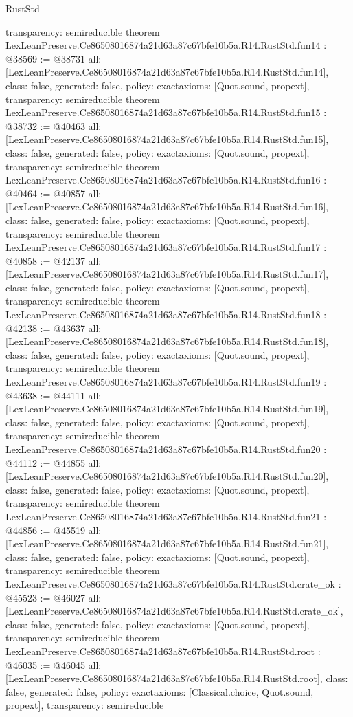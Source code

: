 \begin{lexlean}{RustStd}
\begin{coremodule}
{  transparency: semireducible
}
theorem LexLeanPreserve.Ce86508016874a21d63a87c67bfe10b5a.R14.RustStd.fun14 : @38569 := @38731 {
  all: [LexLeanPreserve.Ce86508016874a21d63a87c67bfe10b5a.R14.RustStd.fun14],
  class: false,
  generated: false,
  policy: exact{axioms: [Quot.sound, propext]},
  transparency: semireducible
}
theorem LexLeanPreserve.Ce86508016874a21d63a87c67bfe10b5a.R14.RustStd.fun15 : @38732 := @40463 {
  all: [LexLeanPreserve.Ce86508016874a21d63a87c67bfe10b5a.R14.RustStd.fun15],
  class: false,
  generated: false,
  policy: exact{axioms: [Quot.sound, propext]},
  transparency: semireducible
}
theorem LexLeanPreserve.Ce86508016874a21d63a87c67bfe10b5a.R14.RustStd.fun16 : @40464 := @40857 {
  all: [LexLeanPreserve.Ce86508016874a21d63a87c67bfe10b5a.R14.RustStd.fun16],
  class: false,
  generated: false,
  policy: exact{axioms: [Quot.sound, propext]},
  transparency: semireducible
}
theorem LexLeanPreserve.Ce86508016874a21d63a87c67bfe10b5a.R14.RustStd.fun17 : @40858 := @42137 {
  all: [LexLeanPreserve.Ce86508016874a21d63a87c67bfe10b5a.R14.RustStd.fun17],
  class: false,
  generated: false,
  policy: exact{axioms: [Quot.sound, propext]},
  transparency: semireducible
}
theorem LexLeanPreserve.Ce86508016874a21d63a87c67bfe10b5a.R14.RustStd.fun18 : @42138 := @43637 {
  all: [LexLeanPreserve.Ce86508016874a21d63a87c67bfe10b5a.R14.RustStd.fun18],
  class: false,
  generated: false,
  policy: exact{axioms: [Quot.sound, propext]},
  transparency: semireducible
}
theorem LexLeanPreserve.Ce86508016874a21d63a87c67bfe10b5a.R14.RustStd.fun19 : @43638 := @44111 {
  all: [LexLeanPreserve.Ce86508016874a21d63a87c67bfe10b5a.R14.RustStd.fun19],
  class: false,
  generated: false,
  policy: exact{axioms: [Quot.sound, propext]},
  transparency: semireducible
}
theorem LexLeanPreserve.Ce86508016874a21d63a87c67bfe10b5a.R14.RustStd.fun20 : @44112 := @44855 {
  all: [LexLeanPreserve.Ce86508016874a21d63a87c67bfe10b5a.R14.RustStd.fun20],
  class: false,
  generated: false,
  policy: exact{axioms: [Quot.sound, propext]},
  transparency: semireducible
}
theorem LexLeanPreserve.Ce86508016874a21d63a87c67bfe10b5a.R14.RustStd.fun21 : @44856 := @45519 {
  all: [LexLeanPreserve.Ce86508016874a21d63a87c67bfe10b5a.R14.RustStd.fun21],
  class: false,
  generated: false,
  policy: exact{axioms: [Quot.sound, propext]},
  transparency: semireducible
}
theorem LexLeanPreserve.Ce86508016874a21d63a87c67bfe10b5a.R14.RustStd.crate_ok : @45523 := @46027 {
  all: [LexLeanPreserve.Ce86508016874a21d63a87c67bfe10b5a.R14.RustStd.crate_ok],
  class: false,
  generated: false,
  policy: exact{axioms: [Quot.sound, propext]},
  transparency: semireducible
}
theorem LexLeanPreserve.Ce86508016874a21d63a87c67bfe10b5a.R14.RustStd.root : @46035 := @46045 {
  all: [LexLeanPreserve.Ce86508016874a21d63a87c67bfe10b5a.R14.RustStd.root],
  class: false,
  generated: false,
  policy: exact{axioms: [Classical.choice, Quot.sound, propext]},
  transparency: semireducible
}


\end{coremodule}
\end{lexlean}
